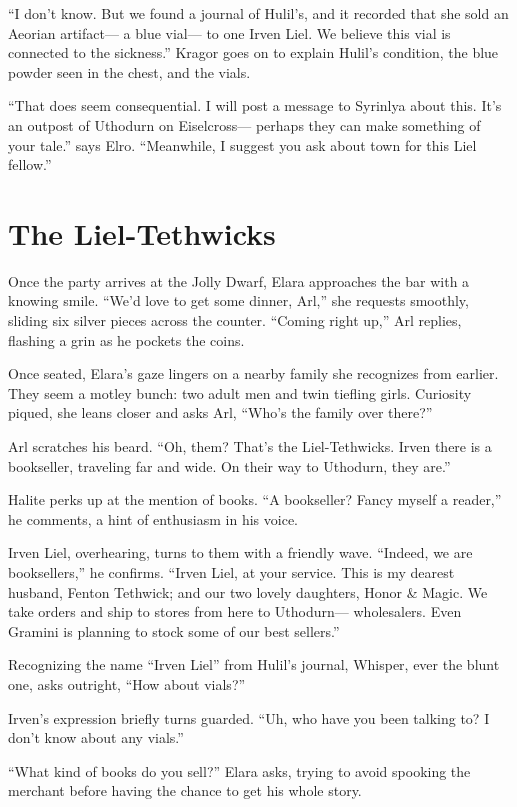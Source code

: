 \documentclass[
  letterpaper,12pt,twoside,twocolumn,openany,
  nodeprecatedcode,bg=full]{dndbook}
\begin{document}
``I don't know. But we found a journal of Hulil's, and it recorded that
she sold an Aeorian artifact--- a blue vial--- to one Irven Liel. We
believe this vial is connected to the sickness.'' Kragor goes on to
explain Hulil's condition, the blue powder seen in the chest, and the
vials.

``That does seem consequential. I will post a message to Syrinlya about
this. It's an outpost of Uthodurn on Eiselcross--- perhaps they can make
something of your tale.'' says Elro. ``Meanwhile, I suggest you ask
about town for this Liel fellow.''

\section{The Liel-Tethwicks}\label{the-liel-tethwicks}

Once the party arrives at the Jolly Dwarf, Elara approaches the bar with
a knowing smile. ``We'd love to get some dinner, Arl,'' she requests
smoothly, sliding six silver pieces across the counter. ``Coming right
up,'' Arl replies, flashing a grin as he pockets the coins.

Once seated, Elara's gaze lingers on a nearby family she recognizes from
earlier. They seem a motley bunch: two adult men and twin tiefling
girls. Curiosity piqued, she leans closer and asks Arl, ``Who's the
family over there?''

Arl scratches his beard. ``Oh, them? That's the Liel-Tethwicks. Irven
there is a bookseller, traveling far and wide. On their way to Uthodurn,
they are.''

Halite perks up at the mention of books. ``A bookseller? Fancy myself a
reader,'' he comments, a hint of enthusiasm in his voice.

Irven Liel, overhearing, turns to them with a friendly wave. ``Indeed,
we are booksellers,'' he confirms. ``Irven Liel, at your service. This
is my dearest husband, Fenton Tethwick; and our two lovely daughters,
Honor \& Magic. We take orders and ship to stores from here to
Uthodurn--- wholesalers. Even Gramini is planning to stock some of our
best sellers.''

Recognizing the name ``Irven Liel'' from Hulil's journal, Whisper, ever
the blunt one, asks outright, ``How about vials?''

Irven's expression briefly turns guarded. ``Uh, who have you been
talking to? I don't know about any vials.''

``What kind of books do you sell?'' Elara asks, trying to avoid spooking
the merchant before having the chance to get his whole story.
\end{document}
